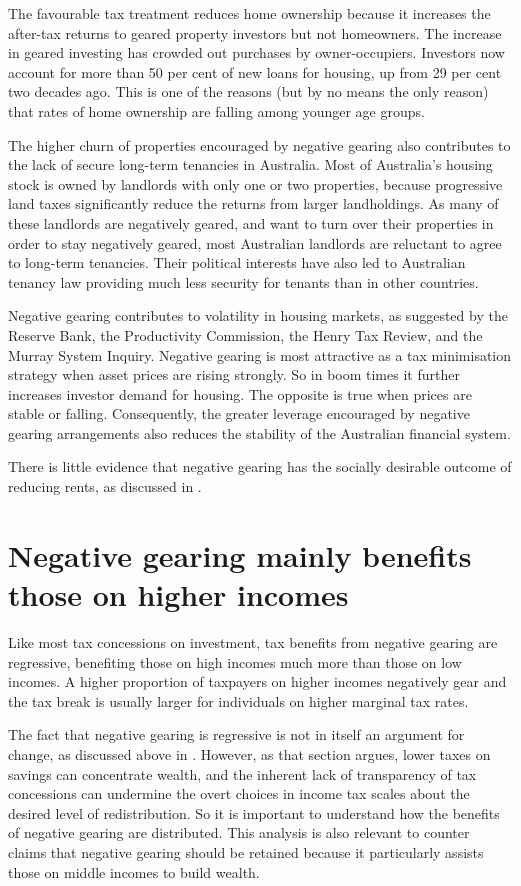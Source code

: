 \documentclass{grattan}\usepackage[]{graphicx}\usepackage[]{color}
\begin{document}
The favourable tax treatment reduces home ownership because it increases the after-tax returns to geared property investors but not homeowners. The increase in geared investing has crowded out purchases by owner-occupiers. Investors now account for more than 50 per cent of new loans for housing, up from 29 per cent two decades ago.  This is one of the reasons (but by no means the only reason) that rates of home ownership are falling among younger age groups.

The higher churn of properties encouraged by negative gearing also contributes to the lack of secure long-term tenancies in Australia. Most of Australia's housing stock is owned by landlords with only one or two properties, because progressive land taxes significantly reduce the returns from larger landholdings.  As many of these landlords are negatively geared, and want to turn over their properties in order to stay negatively geared, most Australian landlords are reluctant to agree to long-term tenancies. Their political interests have also led to Australian tenancy law providing much less security for tenants than in other countries. 

Negative gearing contributes to volatility in housing markets, as suggested by the Reserve Bank, the Productivity Commission, the Henry Tax Review, and the Murray System Inquiry.  Negative gearing is most attractive as a tax minimisation strategy when asset prices are rising strongly. So in boom times it further increases investor demand for housing. The opposite is true when prices are stable or falling. Consequently, the greater leverage encouraged by negative gearing arrangements also reduces the stability of the Australian financial system.

There is little evidence that negative gearing has the socially desirable outcome of reducing rents, as discussed in .

\section{Negative gearing mainly benefits those on higher incomes}
Like most tax concessions on investment, tax benefits from negative gearing are regressive, benefiting those on high incomes much more than those on low incomes. A higher proportion of taxpayers on higher incomes negatively gear and the tax break is usually larger for individuals on higher marginal tax rates. 

The fact that negative gearing is regressive is not in itself an argument for change, as discussed above in . However, as that section argues, lower taxes on savings can concentrate wealth, and the inherent lack of transparency of tax concessions can undermine the overt choices in income tax scales about the desired level of redistribution. So it is important to understand how the benefits of negative gearing are distributed. This analysis is also relevant to counter claims that negative gearing should be retained because it particularly assists those on middle incomes to build wealth. 
\end{document}
